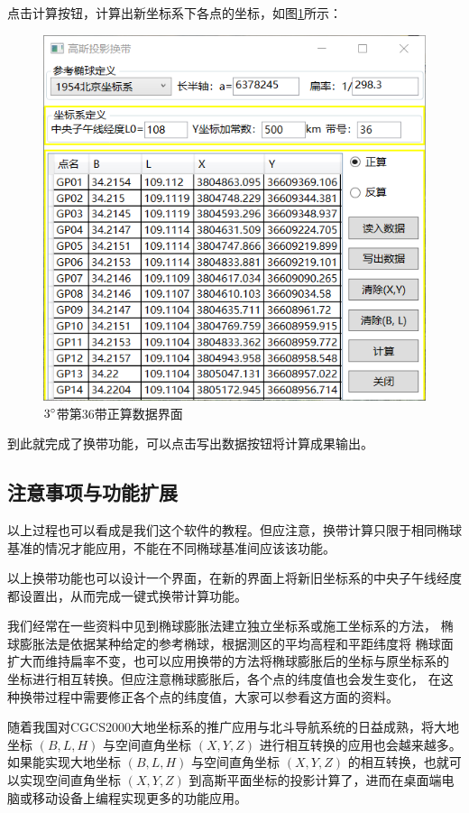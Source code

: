 点击计算按钮，计算出新坐标系下各点的坐标，如图\ref{fig:GaussProjUI06}所示：
\begin{figure}[htbp]
    \centering
    \includegraphics[scale=0.8]{gaussProj/UI06.png}
    \caption{$3^\circ$带第36带正算数据界面}
    \label{fig:GaussProjUI06}
\end{figure}

到此就完成了换带功能，可以点击写出数据按钮将计算成果输出。

\subsection{注意事项与功能扩展}

以上过程也可以看成是我们这个软件的教程。但应注意，换带计算只限于相同椭球
基准的情况才能应用，不能在不同椭球基准间应该该功能。

以上换带功能也可以设计一个界面，在新的界面上将新旧坐标系的中央子午线经度
都设置出，从而完成一键式换带计算功能。

我们经常在一些资料中见到椭球膨胀法建立独立坐标系或施工坐标系的方法，
椭球膨胀法是依据某种给定的参考椭球，根据测区的平均高程和平距纬度将
椭球面扩大而维持扁率不变，也可以应用换带的方法将椭球膨胀后的坐标与原坐标系的
坐标进行相互转换。但应注意椭球膨胀后，各个点的纬度值也会发生变化，
在这种换带过程中需要修正各个点的纬度值，大家可以参看这方面的资料。

随着我国对CGCS2000大地坐标系的推广应用与北斗导航系统的日益成熟，将大地坐标 $(B, L, H)$
与空间直角坐标 $(X, Y, Z)$ 进行相互转换的应用也会越来越多。如果能实现大地坐标 $(B, L, H)$
与空间直角坐标 $(X, Y, Z)$ 的相互转换，也就可以实现空间直角坐标 $(X, Y, Z)$
到高斯平面坐标的投影计算了，进而在桌面端电脑或移动设备上编程实现更多的功能应用。

